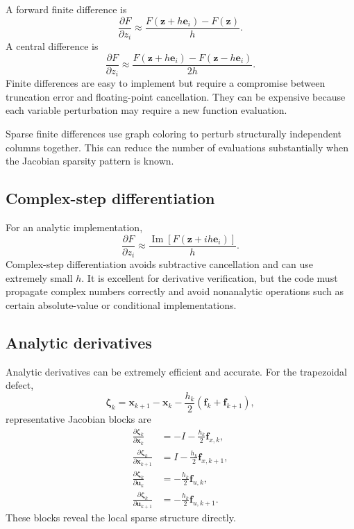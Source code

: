 \documentclass[11pt]{article}
\newcommand{\vect}[1]{\boldsymbol{#1}}
\newcommand{\xstate}{\vect{x}}
\newcommand{\uvec}{\vect{u}}
\newcommand{\zvec}{\vect{z}}
\newcommand{\fvec}{\vect{f}}
\begin{document}
A forward finite difference is
\begin{equation}
\frac{\partial F}{\partial z_i}\approx
\frac{F(\zvec+h\vect{e}_i)-F(\zvec)}{h}.
\end{equation}
A central difference is
\begin{equation}
\frac{\partial F}{\partial z_i}\approx
\frac{F(\zvec+h\vect{e}_i)-F(\zvec-h\vect{e}_i)}{2h}.
\end{equation}
Finite differences are easy to implement but require a compromise between truncation error and floating-point cancellation. They can be expensive because each variable perturbation may require a new function evaluation.

Sparse finite differences use graph coloring to perturb structurally independent columns together. This can reduce the number of evaluations substantially when the Jacobian sparsity pattern is known.

\subsection{Complex-step differentiation}

For an analytic implementation,
\begin{equation}
\frac{\partial F}{\partial z_i}
\approx \frac{\operatorname{Im}\left[F(\zvec+i h\vect{e}_i)\right]}{h}.
\end{equation}
Complex-step differentiation avoids subtractive cancellation and can use extremely small $h$. It is excellent for derivative verification, but the code must propagate complex numbers correctly and avoid nonanalytic operations such as certain absolute-value or conditional implementations.

\subsection{Analytic derivatives}

Analytic derivatives can be extremely efficient and accurate. For the trapezoidal defect,
\begin{equation}
\vect{\zeta}_k=
\xstate_{k+1}-\xstate_k-\frac{h_k}{2}(\fvec_k+\fvec_{k+1}),
\end{equation}
representative Jacobian blocks are
\begin{align}
\frac{\partial\vect{\zeta}_k}{\partial\xstate_k}
&=-I-\frac{h_k}{2}\fvec_{x,k},\\
\frac{\partial\vect{\zeta}_k}{\partial\xstate_{k+1}}
&=I-\frac{h_k}{2}\fvec_{x,k+1},\\
\frac{\partial\vect{\zeta}_k}{\partial\uvec_k}
&=-\frac{h_k}{2}\fvec_{u,k},\\
\frac{\partial\vect{\zeta}_k}{\partial\uvec_{k+1}}
&=-\frac{h_k}{2}\fvec_{u,k+1}.
\end{align}
These blocks reveal the local sparse structure directly.
\end{document}
